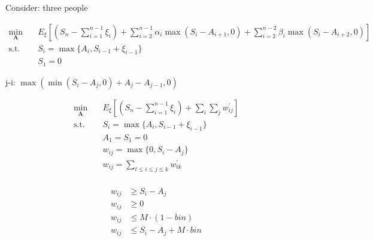 \documentclass{article}
\begin{document}
Consider: three people

\begin{equation}
    \begin{aligned}
        \min_{\mathbf{A}} \quad & E_{\xi}\left[\left(S_n-\sum_{i=1}^{n-1} \xi_i\right)+ \sum_{i=2}^{n-1} \alpha_i \max(S_i - A_{i+1}, 0) + \sum_{i=2}^{n-2} \beta_i \max(S_i - A_{i+2}, 0)  \right] \\
        \mbox {s.t.} \quad & S_{i} = \max\{A_{i}, S_{i-1} + \xi_{i-1}\} \\
        & S_{1} = 0
    \end{aligned}
\end{equation}


j-i: $\max (\min (S_{i} - A_{j}, 0) + A_{j} -A_{j-1}, 0)$



\begin{equation}
    \begin{aligned}
        \min_{\mathbf{A}} \quad & E_{\xi}\left[\left(S_n-\sum_{i=1}^{n-1} \xi_i\right)+ 
        \sum_{i} \sum_{j} w_{ij}^{\prime} \right] \\
        \mbox {s.t.} \quad & S_{i} = \max\{A_{i}, S_{i-1} + \xi_{i-1}\} \\
        & A_{1} = S_{1} = 0 \\
        & w_{ij} = \max\{0, S_{i} - A_{j}\} \\
        & w_{ij} = \sum_{t \leq i \leq j \leq k} w_{tk}^{\prime} \\
    \end{aligned}
\end{equation}

\begin{align*}
    w_{ij} & \geq S_{i} - A_{j} \\
    w_{ij} & \geq 0 \\
    w_{ij} & \leq M \cdot (1-bin) \\
    w_{ij} & \leq S_{i} -A_{j} + M \cdot bin 
\end{align*}
\end{document}
